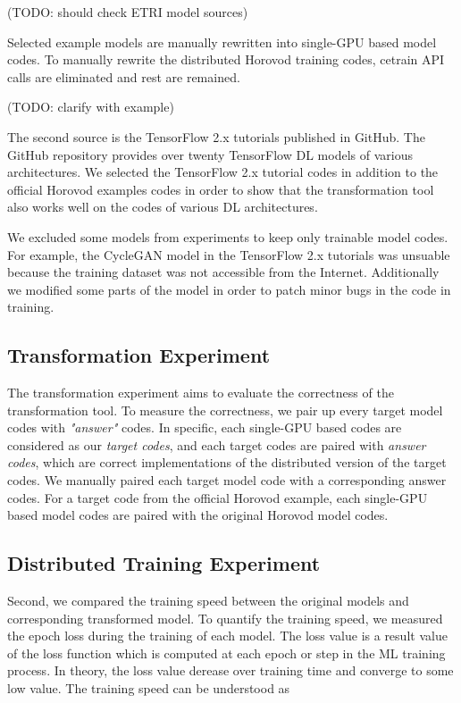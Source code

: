 (TODO: should check ETRI model sources)

Selected example models are manually rewritten into
single-GPU based model codes. To manually rewrite the distributed Horovod
training codes, cetrain API calls are eliminated and rest are remained.   

(TODO: clarify with example)

The second source is the TensorFlow 2.x tutorials published in
GitHub\cite{tf2tutogithub}. The GitHub repository provides over twenty
TensorFlow DL models of various architectures. 
We selected the TensorFlow 2.x tutorial codes in addition to the official
Horovod examples codes in order to show that the transformation tool
also works well on the codes of various DL architectures.

We excluded some models from experiments to keep only trainable model codes. 
For example, the CycleGAN model in the TensorFlow 2.x tutorials
was unsuable because the training dataset was not accessible from the
Internet. Additionally we modified some parts of the model in order to patch
minor bugs in the code in training.

\subsection{Transformation Experiment}

The transformation experiment aims to evaluate the correctness of the
transformation tool. To measure the correctness, we pair up every
target model codes with \textit{"answer"} codes. In specific,      
each single-GPU based codes are considered as our \textit{target codes},
and each target codes are paired with \textit{answer codes}, which are
correct implementations of the distributed version of the target codes. 
We manually paired each target model code with a corresponding answer codes.
For a target code from the official Horovod example, each single-GPU based
model codes are paired with the original Horovod model codes.     


\subsection{Distributed Training Experiment}

Second, we compared the training speed between the original models and
corresponding transformed model. 
To quantify the training speed, we measured the epoch loss during the training
of each model.
The loss value is a result value of the loss function which is computed
at each epoch or step in the ML training process.
In theory, the loss value derease over training time and converge
to some low value.
The training speed can be understood as  

